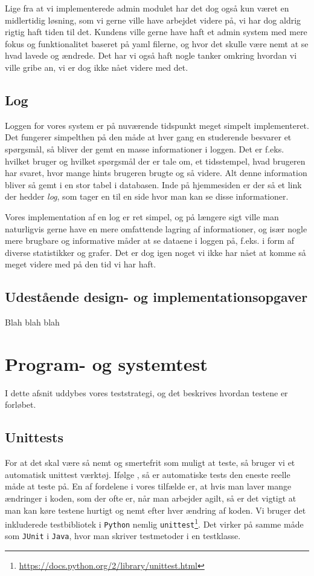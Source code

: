 \documentclass[11pt, a4paper]{article}
\begin{document}
Lige fra at vi implementerede admin modulet har det dog også kun været en midlertidig løsning, som vi gerne ville have arbejdet videre på, vi har dog aldrig rigtig haft tiden til det. Kundens ville gerne have haft et admin system med mere fokus og funktionalitet baseret på yaml filerne, og hvor det skulle være nemt at se hvad lavede og ændrede. Det har vi også haft nogle tanker omkring hvordan vi ville gribe an, vi er dog ikke nået videre med det.

\subsection{Log}
\label{sub:log}
Loggen for vores system er på nuværende tidspunkt meget simpelt implementeret. Det fungerer simpelthen på den måde at hver gang en studerende besvarer et spørgsmål, så bliver der gemt en masse informationer i loggen. Det er f.eks. hvilket bruger og hvilket spørgsmål der er tale om, et tidsstempel, hvad brugeren har svaret, hvor mange hints brugeren brugte og så videre. Alt denne information bliver så gemt i en stor tabel i databasen. Inde på hjemmesiden er der så et link der hedder \emph{log}, som tager en til en side hvor man kan se disse informationer.

Vores implementation af en log er ret simpel, og på længere sigt ville man naturligvis gerne have en mere omfattende lagring af informationer, og især nogle mere brugbare og informative måder at se dataene i loggen på, f.eks. i form af diverse statistikker og grafer. Det er dog igen noget vi ikke har nået at komme så meget videre med på den tid vi har haft.

\subsection{Udestående design- og implementationsopgaver}
\label{sub:udestaende_design_og_implementationsopgaver}
Blah blah blah

\section{Program- og systemtest}
\label{sec:program_og_systemtest}
I dette afsnit uddybes vores teststrategi, og det beskrives hvordan testene er forløbet.

\subsection{Unittests}
\label{sub:unittests}
For at det skal være så nemt og smertefrit som muligt at teste, så bruger vi et automatisk unittest værktøj. Ifølge \cite{COCO}, så er automatiske tests den eneste reelle måde at teste på. En af fordelene i vores tilfælde er, at hvis man laver mange ændringer i koden, som der ofte er, når man arbejder agilt, så er det vigtigt at man kan køre testene hurtigt og nemt efter hver ændring af koden. Vi bruger det inkluderede testbibliotek i \verb!Python! nemlig \verb!unittest!\footnote{\url{https://docs.python.org/2/library/unittest.html}}. Det virker på samme måde som \verb!JUnit! i \verb!Java!, hvor man skriver testmetoder i en testklasse.
\end{document}
